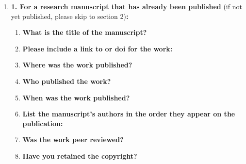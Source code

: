 	
	\begin{enumerate}\itemsep0em
%		
		\item \textbf{1.	For a research manuscript that has already been published} (if not yet published, please skip to section 2)\textbf{:}
%
		\begin{enumerate}\itemsep0em
%			
			\item \textbf{What is the title of the manuscript?}
						\item \textbf{Please include a link to or doi for the work:}
			
			\item \textbf{Where was the work published?}

			\item \textbf{Who published the work?}

			\item \textbf{When was the work published?}

			\item \textbf{List the manuscript's authors in the order they appear on the publication:}

			\item \textbf{Was the work peer reviewed?}

			\item \textbf{Have you retained the copyright?}


\end{enumerate}
\end{enumerate}

